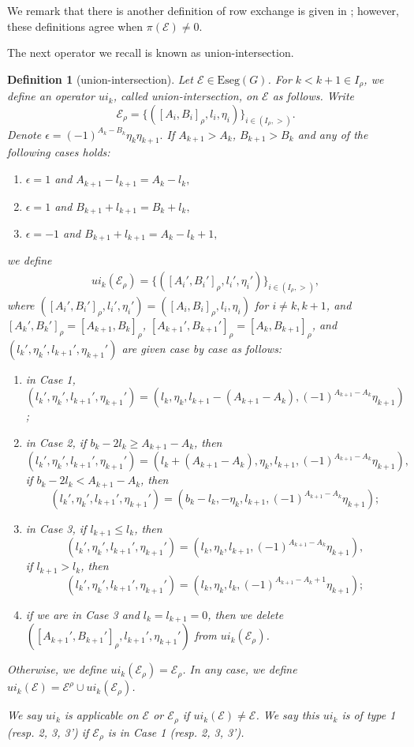 \documentclass[11pt,letterpaper]{amsart}
\newcommand{\Eseg}{{\mathrm{Eseg}}}
\newcommand{\EE}{\mathcal{E}}
\newtheorem{defn}[thm]{Definition}
\numberwithin{equation}{section}
\begin{document}
We remark that there is another definition of row exchange is given in \cite[Section 4.2]{Ato20b}; however, these definitions agree when $\pi(\EE)\neq 0.$ 

The next operator we recall is known as union-intersection.
\begin{defn}[union-intersection]\label{ui def}
 Let $\EE\in\Eseg(G)$. For $k< k+1 \in I_{\rho}$, we define an operator $ui_k$, called union-intersection, on $\EE$ as follows. Write 
 \[ \EE_{\rho}= \{([A_i,B_i]_\rho, l_i,\eta_i)\}_{i \in (I_{\rho},>)}.\]
  Denote $\epsilon=(-1)^{A_k-B_k}\eta_k \eta_{k+1}.$ If $A_{k+1}>A_k$, $B_{k+1}>B_k$ and any of the following cases holds:
\begin{enumerate}
    \item [{Case 1}.] $ \epsilon=1$ and $A_{k+1}-l_{k+1}=A_k-l_k,$
    \item [{Case 2}.] $ \epsilon=1$ and $B_{k+1}+l_{k+1}=B_k+l_k,$
    \item [{Case 3}.] $ \epsilon=-1$ and $B_{k+1}+l_{k+1}=A_k-l_k+1,$
\end{enumerate}
we define
\begin{align*}
     ui_{k}(\EE_{\rho})=\{ ([A_i',B_i']_{\rho},l_i',\eta_i')\}_{i \in (I_{\rho}, >)},
\end{align*} 
where $ ([A_i',B_i']_{\rho},l_i',\eta_i')=([A_i,B_i]_{\rho},l_i,\eta_i)$ for $i \neq k,k+1$, and $[A_k',B_k']_{\rho}=[A_{k+1},B_k]_{\rho}$, $[A_{k+1}',B_{k+1}']_{\rho}=[A_k,B_{k+1}]_{\rho}$, and $( l_k', \eta_k', l_{k+1}',\eta_{k+1}' )$ are given case by case as follows:
\begin{enumerate}
    \item[$(1)$] in Case 1, $( l_k', \eta_k', l_{k+1}',\eta_{k+1}' )= (l_k,\eta_k, l_{k+1}-(A_{k+1}-A_k), (-1)^{A_{k+1}-A_k}\eta_{k+1})$;
    \item [$(2)$] in Case 2, if $b_k-2l_k \geq A_{k+1}-A_k$, then
    \[( l_k', \eta_k', l_{k+1}',\eta_{k+1}' )= (l_k+(A_{k+1}-A_k),\eta_k, l_{k+1}, (-1)^{A_{k+1}-A_k}\eta_{k+1}),\]
    if $b_k-2l_k < A_{k+1}-A_k$, then
    \[( l_k', \eta_k', l_{k+1}',\eta_{k+1}' )= (b_k-l_k,-\eta_k, l_{k+1}, (-1)^{A_{k+1}-A_k}\eta_{k+1});\]
    \item [$(3)$] in Case 3, if $l_{k+1} \leq  l_k$, then
    \[( l_k', \eta_k', l_{k+1}',\eta_{k+1}' )= (l_k,\eta_k, l_{k+1}, (-1)^{A_{k+1}-A_k}\eta_{k+1}),\]
    if $l_{k+1}> l_{k}$, then
    \[( l_k', \eta_k', l_{k+1}',\eta_{k+1}' )= (l_k,\eta_k, l_{k}, (-1)^{A_{k+1}-A_k+1}\eta_{k+1});\]
    \item [$(3')$] if we are in Case 3 and $l_k=l_{k+1}=0$, then we delete $ ([A_{k+1}',B_{k+1}']_{\rho},l_{k+1}',\eta_{k+1}')$ from $ui_k(\EE_{\rho})$.
\end{enumerate}
Otherwise, we define $ui_k(\EE_{\rho})=\EE_{\rho}$. In any case, we define $ui_k(\EE)= \EE^{\rho} \cup ui_k(\EE_{\rho})$.


We say $ui_k$ is applicable on $\EE$ or $\EE_{\rho}$ if $ui_k(\EE)\neq \EE$. We say this $ui_k$ is of type 1 (resp. 2, 3, 3') if $\EE_{\rho}$ is in Case 1 (resp. 2, 3, 3'). 
\end{defn}
\end{document}
